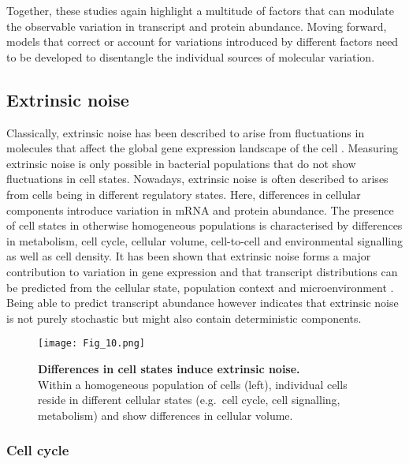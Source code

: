 Together, these studies again highlight a multitude of factors that can modulate the observable variation in transcript and protein abundance. 
Moving forward, models that correct or account for variations introduced by different factors need to be developed to disentangle the individual sources of molecular variation.

\newpage

\subsection{Extrinsic noise}

Classically, extrinsic noise has been described to arise from fluctuations in molecules that affect the global gene expression landscape of the cell \cite{Elowitz2002}.
Measuring extrinsic noise is only possible in bacterial populations that do not show fluctuations in cell states.
Nowadays, extrinsic noise is often described to arises from cells being in different regulatory states.
Here, differences in cellular components introduce variation in mRNA and protein abundance. 
The presence of cell states in otherwise homogeneous populations is characterised by differences in metabolism, cell cycle, cellular volume, cell-to-cell and environmental signalling as well as cell density. 
It has been shown that extrinsic noise forms a major contribution to variation in gene expression and that transcript distributions can be predicted from the cellular state, population context and microenvironment \citep{Battich2015a}.
Being able to predict transcript abundance however indicates that extrinsic noise is not purely stochastic but might also contain deterministic components.

\begin{figure}[!h]
\centering
\texttt{[image: Fig\_10.png]}
\caption[Differences in cell states induce extrinsic noise]{\textbf{Differences in cell states induce extrinsic noise.}\\
Within a homogeneous population of cells (left), individual cells reside in different cellular states (e.g.~cell cycle, cell signalling, metabolism) and show differences in cellular volume.}
\label{fig0:extrinsic}
\end{figure} 

\subsubsection{Cell cycle}

